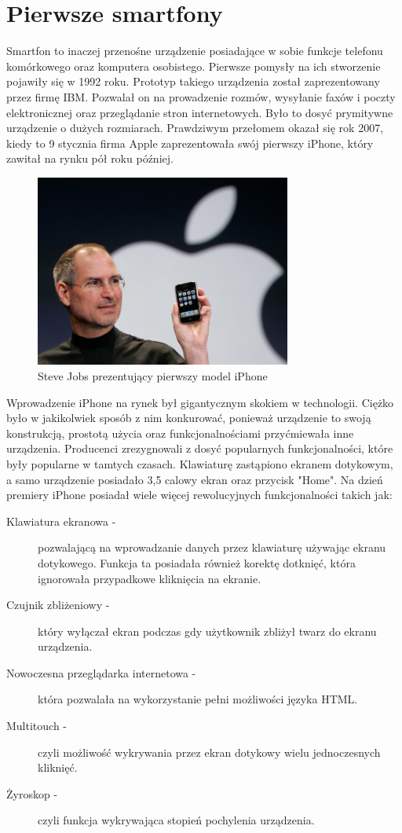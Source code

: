 \documentclass[a4paper,12pt,oneside]{book}
\begin{document}
	\section{Pierwsze smartfony}
	Smartfon to inaczej przenośne urządzenie posiadające w sobie funkcje telefonu komórkowego oraz komputera osobistego. Pierwsze pomysły na ich stworzenie pojawiły się w 1992 roku. Prototyp takiego urządzenia został zaprezentowany przez firmę IBM. Pozwalał on na prowadzenie rozmów, wysyłanie faxów i poczty elektronicznej oraz przeglądanie stron internetowych. Było to dosyć prymitywne urządzenie o dużych rozmiarach. Prawdziwym przełomem okazał się rok 2007, kiedy to 9 stycznia firma Apple zaprezentowała swój pierwszy iPhone, który zawitał na rynku pół roku później.
	
	\begin{figure}[h]
		\centering
		\includegraphics[width=0.75\textwidth]{grafika/steve_jobs_iphone_presentation.png}
		\caption{Steve Jobs prezentujący pierwszy model iPhone}
	\end{figure}
	
	Wprowadzenie iPhone na rynek był gigantycznym skokiem w technologii. Ciężko było w jakikolwiek sposób z nim konkurować, ponieważ urządzenie to swoją konstrukcją, prostotą użycia oraz funkcjonalnościami przyćmiewała inne urządzenia. Producenci zrezygnowali z dosyć popularnych funkcjonalności, które były popularne w tamtych czasach. Klawiaturę zastąpiono ekranem dotykowym, a samo urządzenie posiadało 3,5 calowy ekran oraz przycisk "Home". 
	\newpage
	Na dzień premiery iPhone posiadał wiele więcej rewolucyjnych funkcjonalności takich jak:
	
	\begin{description}
		\item[Klawiatura ekranowa -] pozwalającą na wprowadzanie danych przez klawiaturę używając ekranu dotykowego. Funkcja ta posiadała również korektę dotknięć, która ignorowała przypadkowe kliknięcia na ekranie.
		\item[Czujnik zbliżeniowy -] który wyłączał ekran podczas gdy użytkownik zbliżył twarz do ekranu urządzenia.
		\item[Nowoczesna przeglądarka internetowa -] która pozwalała na wykorzystanie pełni możliwości języka HTML.
		\item[Multitouch -] czyli możliwość wykrywania przez ekran dotykowy wielu jednoczesnych kliknięć.
		\item[Żyroskop -] czyli funkcja wykrywająca stopień pochylenia urządzenia. 
	\end{description}
\end{document}
